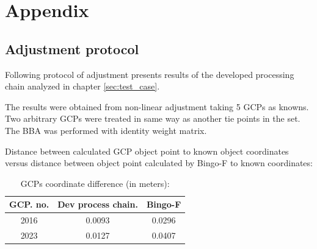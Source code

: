 \documentclass[a4paper,12pt]{article}
\begin{document}












\section{Appendix}
\subsection{Adjustment protocol}
\label{sec:adj_protocol}

Following protocol of adjustment presents results of the developed processing chain
analyzed in chapter \ref{sec:test_case}.

The results were  obtained from non-linear adjustment taking 5 GCPs as knowns.
Two arbitrary GCPs were treated in same way as another tie points 
in the set. The BBA was performed with identity weight matrix. 

Distance between calculated GCP object point  to
 known object coordinates versus distance between object point calculated by  Bingo-F 
 to known coordinates:
\begin{center}
\footnotesize
{}
\begin{longtable}{| c || c | c |}
\caption{GCPs coordinate difference (in meters):}
\\ \hline
\label{table:comparison}
GCP. no. & Dev process chain. &  Bingo-F \\ \hline 
  2016  &    0.0093  &  0.0296 \\ \hline 
  2023 &     0.0127  &   0.0407 \\ \hline 
  \hline 
\end{longtable}
\end{center}
\end{document}
